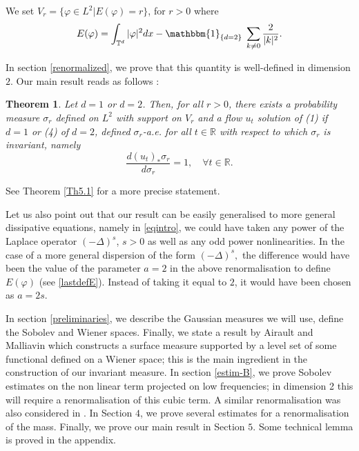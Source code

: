 \documentclass[11pt,leqno]{amsart}
\newtheorem{thm}{Theorem}[section]
\newcommand{\R}{\mathbb{R}}
\newcommand{\T}{\mathbb{T}}
\begin{document}
We set $V_r = \{\varphi \in L^2 | E(\varphi)=r\}$, for $r>0$ where
\begin{equation}
\label{lastdefE}
E(\varphi)=\int_{\T^d } |\varphi|^2 dx - \mathbbm{1}_{\{d=2\} } \; \sum_{k\neq 0} \dfrac{2}{|k|^{2}} . \end{equation}

In section \ref{renormalized}, we prove that this quantity is well-defined in dimension $2$. Our main result reads as follows :


\begin{thm}	\label{main-intro}
Let $d=1$ or $d=2$. Then, for all $r>0$, there exists a probability measure $\sigma_r$ defined on $L^2$ with support on $V_r$ and a flow $u_t$ solution of (1) if $d=1$ or (4) of $d=2$, defined $\sigma_r$-a.e. for all $t\in \mathbb R$ with respect to which $\sigma_r$ is invariant, namely
$$\frac{d (u_t )_\ast \sigma_r}{d\sigma_r}= 1,  \quad  \forall t\in \R .$$
\end{thm}%
See Theorem \ref{Th5.1} for a more precise statement.



Let us also point out that our result can be easily generalised to more general dissipative equations, 
namely in \eqref{eqintro}, we could have taken any power of the Laplace operator
 $(-\Delta)^s$, $s>0$ as well as any odd power nonlinearities. In the case of a more general dispersion of the form 
 $(-\Delta)^s,$ the difference would have been the value of the parameter $a=2$ in the above renormalisation to define $E(\varphi)$ (see \eqref{lastdefE}).
 Instead of taking it equal to $2$, it would have been chosen as $a=2s$.

In section \ref{preliminaries}, we describe the Gaussian measures we will use, define the Sobolev and Wiener spaces.
Finally, we state a result by  Airault and Malliavin \cite{AM} which constructs a surface measure supported by a level set  of 
some  functional defined on a Wiener space; this is the main ingredient in the construction of our invariant measure.
In section \ref{estim-B}, we prove Sobolev estimates on the non linear term projected on low frequencies; in dimension 2 this will require a renormalisation of this cubic term. 
A similar renormalisation was also considered in \cite{B96}. In Section $4$, we prove several estimates for a renormalisation of the mass. 
Finally, we prove our main result  in Section $5$. Some technical lemma is proved in the appendix. 

\vskip 12mm
\end{document}
